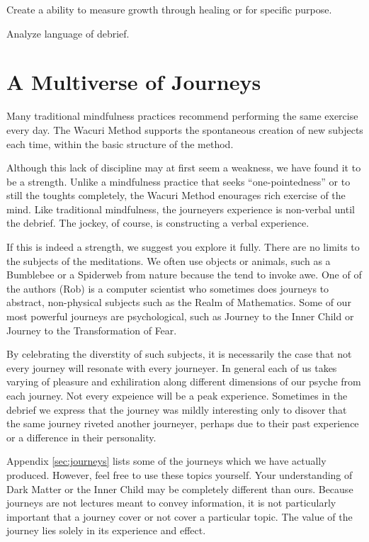 \documentclass[12pt]{book}
\begin{document}
Create a ability to measure growth through healing or for specific
purpose.

Analyze language of debrief.

\chapter{ A Multiverse of Journeys}

Many traditional mindfulness practices recommend performing the
same exercise every day. The Wacuri Method supports the
spontaneous creation of new subjects each time, within the
basic structure of the method.

Although this lack of discipline may at first seem a weakness,
we have found it to be a strength. Unlike a mindfulness practice
that seeks ``one-pointedness'' or to still the toughts completely,
the Wacuri Method enourages rich exercise of the mind. Like
traditional mindfulness, the journeyers experience is non-verbal
until the debrief. The jockey, of course, is constructing a
verbal experience.

If this is indeed a strength, we suggest you explore it
fully. There are no limits to the subjects of the meditations.
We often use objects or animals, such as a Bumblebee or a
Spiderweb from nature because the
tend to invoke awe. One of of the authors (Rob) is a
computer scientist who sometimes does journeys to abstract,
non-physical subjects such as the Realm of Mathematics.
Some of our most powerful journeys are psychological, such
as Journey to the Inner Child or Journey to the Transformation
of Fear.

By celebrating the diverstity of such subjects, it is necessarily
the case that not every journey will resonate with every journeyer.
In general each of us takes varying of pleasure and exhiliration
along different dimensions of our psyche from each journey.
Not every expeience will be a peak experience. Sometimes in
the debrief we express that the journey was mildly interesting
only to disover that the same journey riveted another journeyer,
perhaps due to their past experience or a difference in their
personality.

Appendix \ref{sec:journeys} lists some of the journeys which we have actually
produced. However, feel free to use these topics yourself. Your
understanding of Dark Matter or the Inner Child may be completely
different than ours. Because journeys are not lectures meant
to convey information, it is not particularly important that
a journey cover or not cover a particular topic. The value
of the journey lies solely in its experience and effect.
\end{document}
